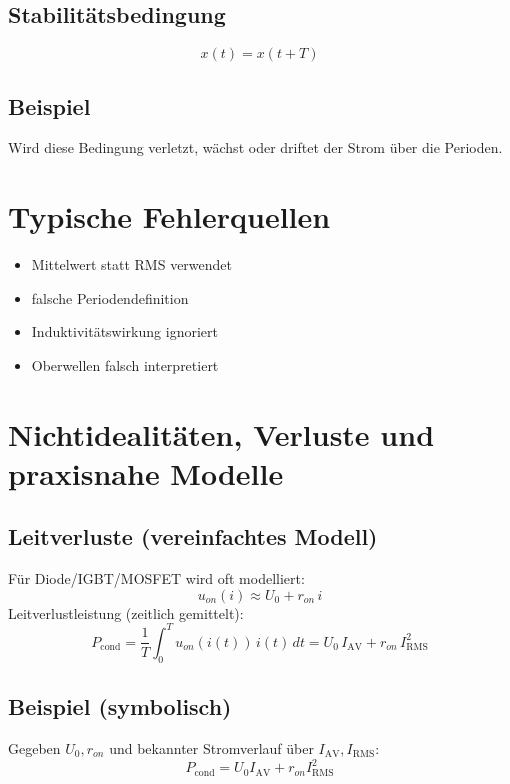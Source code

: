 \documentclass[a4paper,11pt]{article}
\begin{document}
\subsection{Stabilitätsbedingung}
\[
x(t)=x(t+T)
\]

\subsection*{Beispiel}
Wird diese Bedingung verletzt, wächst oder driftet der Strom über die Perioden.

\section{Typische Fehlerquellen}

\begin{itemize}
  \item Mittelwert statt RMS verwendet
  \item falsche Periodendefinition
  \item Induktivitätswirkung ignoriert
  \item Oberwellen falsch interpretiert
\end{itemize}

\newpage
\section{Nichtidealitäten, Verluste und praxisnahe Modelle}

\subsection{Leitverluste (vereinfachtes Modell)}
Für Diode/IGBT/MOSFET wird oft modelliert:
\[
u_{on}(i) \approx U_0 + r_{on}\,i
\]
Leitverlustleistung (zeitlich gemittelt):
\[
P_{\mathrm{cond}}=\frac{1}{T}\int_0^T u_{on}(i(t))\,i(t)\,dt
=U_0\,I_{\mathrm{AV}}+r_{on}\,I_{\mathrm{RMS}}^2
\]

\subsection*{Beispiel (symbolisch)}
Gegeben $U_0,r_{on}$ und bekannter Stromverlauf über $I_{\mathrm{AV}}, I_{\mathrm{RMS}}$:
\[
P_{\mathrm{cond}}=U_0 I_{\mathrm{AV}}+r_{on} I_{\mathrm{RMS}}^2
\]
\end{document}
